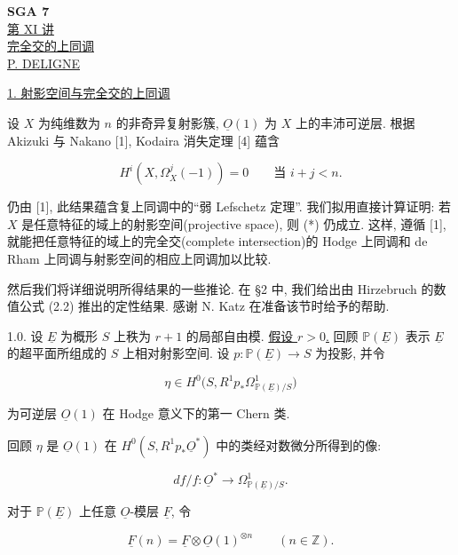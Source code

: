 \clearpage
\ExposeTOC
\begin{center}
{\large\textbf{SGA 7}}\\[1.5em]
{\Large\underline{第 XI 讲}}\\[2.5em]
{\Large\underline{完全交的上同调}}\\[1.5em]
{\large\underline{P. DELIGNE}}
\end{center}

\bigskip
\noindent\underline{1. 射影空间与完全交的上同调}

设 $X$ 为纯维数为 $n$ 的非奇异复射影簇, $\underline O(1)$ 为 $X$ 上的丰沛可逆层. 根据 Akizuki 与 Nakano [1], Kodaira 消失定理 [4] 蕴含

\begin{equation}\tag{*}
H^i(X,\Omega_X^j(-1))=0\qquad\text{当 }i+j<n.
\end{equation}

仍由 [1], 此结果蕴含复上同调中的``弱 Lefschetz 定理''. 我们拟用直接计算证明: 若 $X$ 是任意特征的域上的射影空间(projective space), 则 (*) 仍成立. 这样, 遵循 [1], 就能把任意特征的域上的完全交(complete intersection)的 Hodge 上同调和 de Rham 上同调与射影空间的相应上同调加以比较.

然后我们将详细说明所得结果的一些推论. 在 §2 中, 我们给出由 Hirzebruch 的数值公式 (2.2) 推出的定性结果. 感谢 N. Katz 在准备该节时给予的帮助.

1.0. 设 $\underline E$ 为概形 $S$ 上秩为 $r+1$ 的局部自由模. \underline{假设 $r>0$.} 回顾 $\mathbb P(\underline E)$ 表示 $\underline E$ 的超平面所组成的 $S$ 上相对射影空间. 设 $p:\mathbb P(\underline E)\to S$ 为投影, 并令

\begin{equation*}
\eta\in H^0\bigl(S,R^1p_*\Omega^1_{\mathbb P(\underline E)/S}\bigr)
\end{equation*}

为可逆层 $\underline O(1)$ 在 Hodge 意义下的第一 Chern 类.


回顾 $\eta$ 是 $\underline O(1)$ 在 $H^0(S,R^1p_*\underline O^*)$ 中的类经对数微分所得到的像:

\begin{equation*}
df/f:\underline O^*\longrightarrow
\Omega^1_{\mathbb P(\underline E)/S}.
\end{equation*}

对于 $\mathbb P(\underline E)$ 上任意 $\underline O$-模层 $\underline F$, 令

\begin{equation*}
\underline F(n)=\underline F\otimes\underline O(1)^{\otimes n}
\qquad(n\in\mathbb Z).
\end{equation*}

